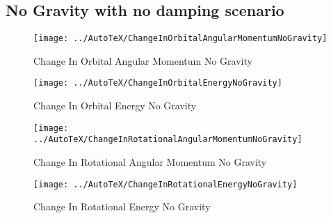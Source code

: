 \subsection{No Gravity with no damping scenario}
\begin{figure}[htbp]
	\centerline{
		\texttt{[image: ../AutoTeX/ChangeInOrbitalAngularMomentumNoGravity]}}
	\caption{Change In Orbital Angular Momentum No Gravity}
	\label{fig:ChangeInOrbitalAngularMomentumNoGravity}
\end{figure}
\begin{figure}[htbp]
	\centerline{
		\texttt{[image: ../AutoTeX/ChangeInOrbitalEnergyNoGravity]}}
	\caption{Change In Orbital Energy No Gravity}
	\label{fig:ChangeInOrbitalEnergyNoGravity}
\end{figure}
\begin{figure}[htbp]
	\centerline{
		\texttt{[image: ../AutoTeX/ChangeInRotationalAngularMomentumNoGravity]}}
	\caption{Change In Rotational Angular Momentum No Gravity}
	\label{fig:ChangeInRotationalAngularMomentumNoGravity}
\end{figure}
\begin{figure}[htbp]
	\centerline{
		\texttt{[image: ../AutoTeX/ChangeInRotationalEnergyNoGravity]}}
	\caption{Change In Rotational Energy No Gravity}
	\label{fig:ChangeInRotationalEnergyNoGravity}
\end{figure}
\clearpage
